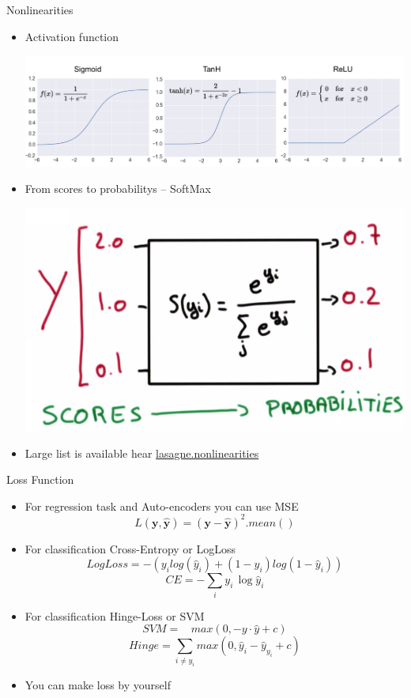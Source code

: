 \documentclass{beamer}
\begin{document}
\begin{frame}{Nonlinearities}
	\begin{itemize}
		\item   Activation function
			\begin{center}
				\includegraphics[scale=0.2]{img/act}
			\end{center} 
		\item    From scores to probabilitys -- SoftMax
			\begin{center}
				 \includegraphics[scale=0.2]{img/sm}
			\end{center}
		\item    Large list is available hear \href{http://lasagne.readthedocs.io/en/latest/modules/nonlinearities.html\#module-lasagne.nonlinearities}{lasagne.nonlinearities} 
	\end{itemize}
\end{frame}



\begin{frame}{Loss Function}
	\begin{itemize}
		\item For regression task and Auto-encoders you can use MSE
			  $$L(\mathbf{y}, \mathbf{\hat{y}}) = (\mathbf{y}-\mathbf{\hat{y}})^2.mean()$$
			
		\item   For classification Cross-Entropy or LogLoss
		  $$LogLoss = -(y_i log(\hat{y}_i)  +(1 - y_i) log(1 - \hat{y}_i))$$
		  $$CE= -\sum_i y_i\, \log \hat{y}_i$$
		\item   For classification Hinge-Loss or SVM \blacksmiley{}
		  $$SVM = ~~~~max(0, - y \cdot \hat{y} + c)$$
		  $$Hinge = \sum_{i \neq y_i} max(0, \hat{y}_i - \hat{y}_{y_i} + c)$$
		\item   You can make loss by yourself 
	\end{itemize}
\end{frame}
\end{document}
